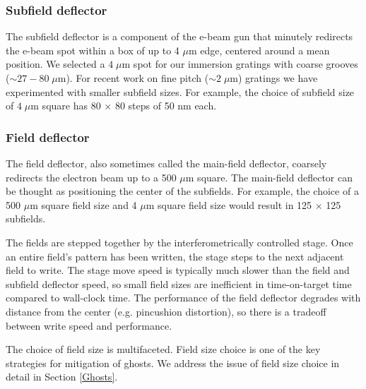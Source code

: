 \documentclass[]{spie}  %
\begin{document}
\subsubsection{Subfield deflector}
The subfield deflector is a component of the e-beam gun that minutely redirects the e-beam spot within a box of up to 4 $\mu$m edge, centered around a mean position.  We selected a $4 \; \mu$m spot for our immersion gratings with coarse grooves ($\sim 27-80 \; \mu$m).  For recent work on fine pitch ($\sim2\; \mu$m) gratings we have experimented with smaller subfield sizes.  For example, the choice of subfield size of $4 \; \mu$m square has 80 $\times$ 80 steps of 50 nm each. 

\subsubsection{Field deflector}
\label{sec:Field}
The field deflector, also sometimes called the main-field deflector, coarsely redirects the electron beam up to a 500 $\mu$m square.  The main-field deflector can be thought as positioning the center of the subfields.  For example, the choice of a 500 $\mu$m square field size and 4 $\mu$m square field size would result in 125 $\times$ 125 subfields.

The fields are stepped together by the interferometrically controlled stage.  Once an entire field's pattern has been written, the stage steps to the next adjacent field to write.  The stage move speed is typically much slower than the field and subfield deflector speed, so small field sizes are inefficient in time-on-target time compared to wall-clock time.  The performance of the field deflector degrades with distance from the center (e.g. pincushion distortion), so there is a tradeoff between write speed and performance.  

The choice of field size is multifaceted.  Field size choice is one of the key strategies for mitigation of ghosts.  We address the issue of field size choice in detail in Section \ref{Ghosts}.  
\end{document}
